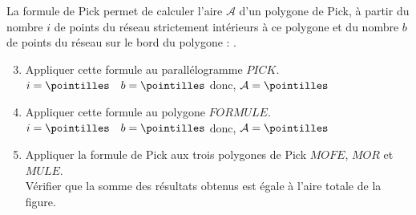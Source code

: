 \begin{enigme}
   La formule de Pick permet de calculer l'aire $\mathcal{A}$ d'un polygone de Pick, à partir du nombre $i$ de points du réseau strictement intérieurs à ce polygone et du nombre $b$ de points du réseau sur le bord du polygone : . 
   \begin{enumerate}
   \setcounter{enumi}{2}
      \item Appliquer cette formule au parallélogramme $PICK$. \\ [3mm]
         $i =\pointilles  \quad b =\pointilles $ \quad donc, $\mathcal{A} = \pointilles $ \\
       \item Appliquer cette formule au polygone $FORMULE$. \\ [3mm]
         $i =\pointilles  \quad b =\pointilles $ \quad donc, $\mathcal{A} = \pointilles $ \\
       \item Appliquer la formule de Pick aux trois polygones de Pick $MOFE$, $MOR$ et $MULE$. \\
         Vérifier que la somme des résultats obtenus est égale à l'aire totale de la figure. \par \bigskip
         \pointilles \par \bigskip
         \pointilles \par \bigskip
         \pointilles 
   \end{enumerate}
\end{enigme}

